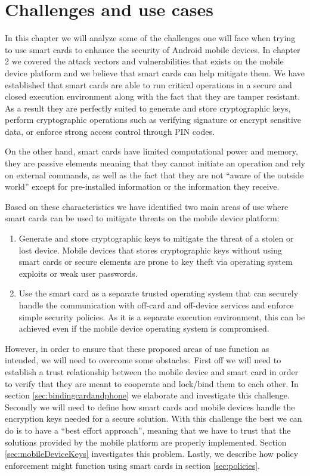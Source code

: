 \chapter{Challenges and use cases}
\label{ch:challenges}
In this chapter we will analyze some of the challenges one will face when trying to use smart cards to enhance the security of Android mobile devices. In chapter 2 we covered the attack vectors and vulnerabilities that exists on the mobile device platform and we believe that smart cards can help mitigate them. We have established that smart cards are able to run critical operations in a secure and closed execution environment along with the fact that they are tamper resistant. As a result they are perfectly suited to generate and store cryptographic keys, perform cryptographic operations such as verifying signature or encrypt sensitive data, or enforce strong access control through PIN codes.

On the other hand, smart cards have limited computational power and memory, they are passive elements meaning that they cannot initiate an operation and rely on external commands, as well as the fact that they are not ``aware of the outside world'' except for pre-installed information or the information they receive.

Based on these characteristics we have identified two main areas of use where smart cards can be used to mitigate threats on the mobile device platform:
\begin{enumerate}
  \item Generate and store cryptographic keys to mitigate the threat of a stolen or lost device. Mobile devices that stores cryptographic keys without using smart cards or secure elements are prone to key theft via operating system exploits or weak user passwords.
  \item Use the smart card as a separate trusted operating system that can securely handle the communication with off-card and off-device services and enforce simple security policies. As it is a separate execution environment, this can be achieved even if the mobile device operating system is compromised.
\end{enumerate}

However, in order to ensure that these proposed areas of use function as intended, we will need to overcome some obstacles. First off we will need to establish a trust relationship between the mobile device and smart card in order to verify that they are meant to cooperate and lock/bind them to each other. In section \ref{sec:bindingcardandphone} we elaborate and investigate this challenge. Secondly we will need to define how smart cards and mobile devices handle the encryption keys needed for a secure solution. With this challenge the best we can do is to have a ``best effort approach'', meaning that we have to trust that the solutions provided by the mobile platform are properly implemented. Section \ref{sec:mobileDeviceKeys} investigates this problem. Lastly, we describe how policy enforcement might function using smart cards in section \ref{sec:policies}.

